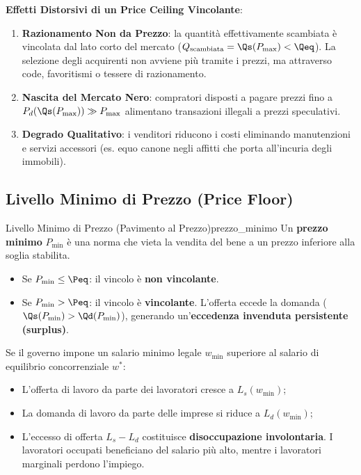\textbf{Effetti Distorsivi di un Price Ceiling Vincolante}:
\begin{enumerate}
    \item \textbf{Razionamento Non da Prezzo}: la quantità effettivamente scambiata è vincolata dal lato corto del mercato ($Q_{\text{scambiata}} = \Qs(P_{\max}) < \Qeq$). La selezione degli acquirenti non avviene più tramite i prezzi, ma attraverso code, favoritismi o tessere di razionamento.
    \item \textbf{Nascita del Mercato Nero}: compratori disposti a pagare prezzi fino a $P_d(\Qs(P_{\max})) \gg P_{\max}$ alimentano transazioni illegali a prezzi speculativi.
    \item \textbf{Degrado Qualitativo}: i venditori riducono i costi eliminando manutenzioni e servizi accessori (es. equo canone negli affitti che porta all'incuria degli immobili).
\end{enumerate}

\subsection{Livello Minimo di Prezzo (Price Floor)}

\begin{definizione}{Livello Minimo di Prezzo (Pavimento al Prezzo)}{prezzo_minimo}
Un \textbf{prezzo minimo} $P_{\min}$ è una norma che vieta la vendita del bene a un prezzo inferiore alla soglia stabilita.
\begin{itemize}
    \item Se $P_{\min} \le \Peq$: il vincolo è \textbf{non vincolante}.
    \item Se $P_{\min} > \Peq$: il vincolo è \textbf{vincolante}. L'offerta eccede la domanda ($\Qs(P_{\min}) > \Qd(P_{\min})$), generando un'\textbf{eccedenza invenduta persistente (surplus)}.
\end{itemize}
\end{definizione}

\begin{esempio}
Se il governo impone un salario minimo legale $w_{\min}$ superiore al salario di equilibrio concorrenziale $w^*$:
\begin{itemize}
    \item L'offerta di lavoro da parte dei lavoratori cresce a $L_s(w_{\min})$;
    \item La domanda di lavoro da parte delle imprese si riduce a $L_d(w_{\min})$;
    \item L'eccesso di offerta $L_s - L_d$ costituisce \textbf{disoccupazione involontaria}. I lavoratori occupati beneficiano del salario più alto, mentre i lavoratori marginali perdono l'impiego.
\end{itemize}
\end{esempio}

